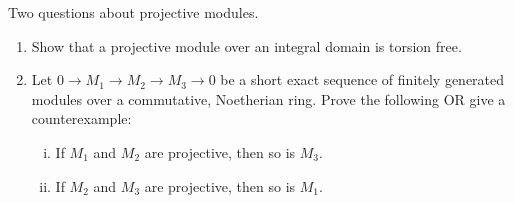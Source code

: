 \begin{question}[subtitle = January 2021 Problem 3,ID=Jan21_3]
Two questions about projective modules.
\begin{enumerate}
    \item Show that a projective module over an integral domain is torsion free.
    \item Let $0 \to M_1 \to M_2 \to M_3 \to 0$ be a short exact sequence of finitely generated modules over a commutative, Noetherian ring. Prove the following OR give a counterexample:
    \begin{enumerate}[(i)]
        \item If $M_1$ and $M_2$ are projective, then so is $M_3$.
        \item If $M_2$ and $M_3$ are projective, then so is $M_1$.
    \end{enumerate}
\end{enumerate}
\end{question}
